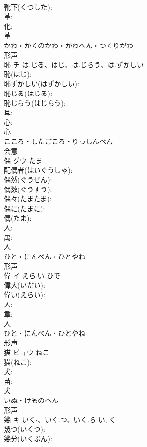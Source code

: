 \documentclass[8pt]{extreport}
\begin{document}
\begin{CJK}{UTF8}{min}
\\	靴下(くつした): 
\\	革: 
\\	化: 
\\	革	
\\	かわ・かくのかわ・かわへん・つくりがわ	
\\	形声 
\\	恥	チ	は.じる、はじ、は.じらう、は.ずかしい		
\\	恥(はじ): 
\\	恥ずかしい(はずかしい): 
\\	恥じる(はじる): 
\\	恥じらう(はじらう): 
\\	耳: 
\\	心: 
\\	心	
\\	こころ・したごころ・りっしんべん	
\\	会意 
\\	偶	グウ	たま		
\\	配偶者(はいぐうしゃ): 
\\	偶然(ぐうぜん): 
\\	偶数(ぐうすう): 
\\	偶々(たまたま): 
\\	偶に(たまに): 
\\	偶(たま): 
\\	人: 
\\	禺: 
\\	人	
\\	ひと・にんべん・ひとやね	
\\	形声 
\\	偉	イ	えら.い	ひで	
\\	偉大(いだい): 
\\	偉い(えらい): 
\\	人: 
\\	韋: 
\\	人	
\\	ひと・にんべん・ひとやね	
\\	形声 
\\	猫	ビョウ	ねこ		
\\	猫(ねこ): 
\\	犬: 
\\	苗: 
\\	犬	
\\	いぬ・けものへん	
\\	形声 
\\	幾	キ	いく-、いく.つ、いく.ら	い, く	
\\	幾つ(いくつ): 
\\	幾分(いくぶん): 

\end{CJK}
\end{document}
